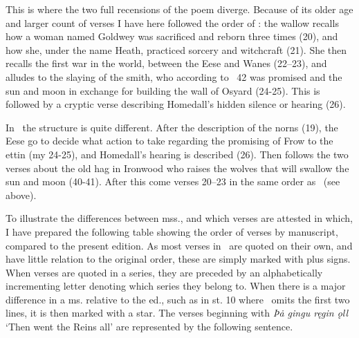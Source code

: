 This is where the two full recensions of the poem diverge. Because of its older age and larger count of verses I have here followed the order of \Regius: the wallow recalls how a woman named Goldwey was sacrificed and reborn three times (20), and how she, under the name Heath, practiced sorcery and witchcraft (21). She then recalls the first war in the world, between the Eese and Wanes (22–23), and alludes to the slaying of the smith, who according to \Gylfaginning\ 42 was promised  and the sun and moon in exchange for building the wall of Osyard (24-25). This is followed by a cryptic verse describing Homedall’s hidden silence or hearing (26).

In \Hauksbok\ the structure is quite different. After the description of the norns (19), the Eese go to decide what action to take regarding the promising of Frow to the ettin (my 24-25), and Homedall’s hearing is described (26). Then follows the two verses about the old hag in Ironwood who raises the wolves that will swallow the sun and moon (40-41). After this come verses 20–23 in the same order as \Regius\ (see above).

To illustrate the differences between mss., and which verses are attested in which, I have prepared the following table showing the order of verses by manuscript, compared to the present edition. As most verses in \GylfMS\ are quoted on their own, and have little relation to the original order, these are simply marked with plus signs. When verses are quoted in a series, they are preceded by an alphabetically incrementing letter denoting which series they belong to. When there is a major difference in a ms. relative to the ed., such as in st. 10 where \GylfMS\ omits the first two lines, it is then marked with a star. The verses beginning with \emph{Þȧ gingu ręgin ǫll} ‘Then went the Reins all’ are represented by the following sentence.

